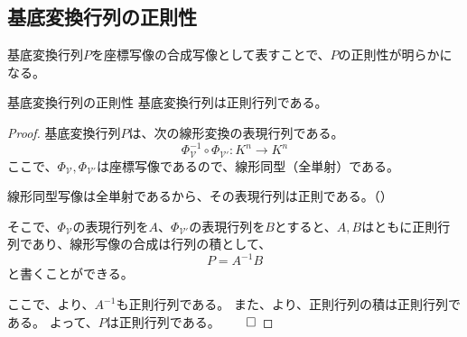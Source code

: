 \documentclass[../../../topic_linear-algebra]{subfiles}
\begin{document}
\subsection{基底変換行列の正則性}

基底変換行列$P$を座標写像の合成写像として表すことで、$P$の正則性が明らかになる。

\begin{theorem*}{基底変換行列の正則性}
  基底変換行列は正則行列である。
\end{theorem*}

\begin{proof}
  基底変換行列$P$は、次の線形変換の表現行列である。
  \begin{equation*}
    \Phi_{\mathcal{V}}^{-1} \circ \Phi_{\mathcal{V}'} \colon K^n \to K^n
  \end{equation*}
  ここで、$\Phi_{\mathcal{V}}, \Phi_{\mathcal{V}'}$は座標写像であるので、線形同型（全単射）である。
  
  \br
  
  線形同型写像は全単射であるから、その表現行列は正則である。（）
  
  そこで、$\Phi_{\mathcal{V}}$の表現行列を$A$、$\Phi_{\mathcal{V}'}$の表現行列を$B$とすると、$A,B$はともに正則行列であり、線形写像の合成は行列の積として、
  \begin{equation*}
    P = A^{-1} B
  \end{equation*}
  と書くことができる。
  
  \br
  
  ここで、より、$A^{-1}$も正則行列である。
  また、より、正則行列の積は正則行列である。
  よって、$P$は正則行列である。$\qed$
\end{proof}
\end{document}
